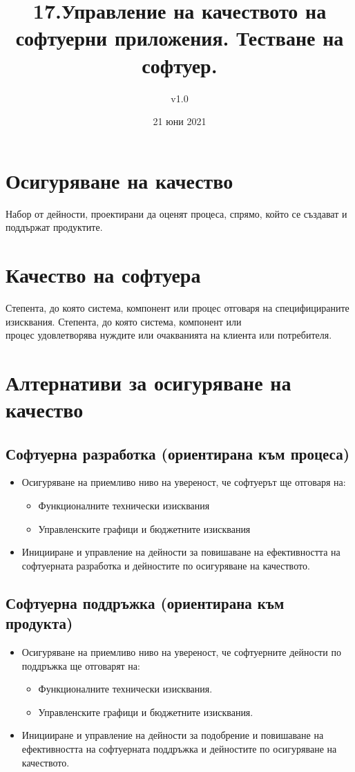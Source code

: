 \documentclass[fleqn,12pt]{article}
\title{17.Управление на качеството на софтуерни приложения. Тестване на софтуер.}
\author{v1.0}
\date{21 юни 2021}
\begin{document}
\maketitle

\tableofcontents

\begin{flushleft}

\section{Осигуряване на качество}
Набор от дейности, проектирани да оценят процеса, спрямо, който се създават и поддържат продуктите.

\section{Качество на софтуера}
Степента, до която система, компонент или процес отговаря на специфицираните изисквания. Степента, до която система, компонент или\\
процес удовлетворява нуждите или очакванията на клиента или потребителя.

\section{Алтернативи за осигуряване на качество}
  \subsection{Софтуерна разработка (ориентирана към процеса)}
  \begin{itemize}
    \item Осигуряване на приемливо ниво на увереност, че софтуерът ще отговаря на:
      \begin{itemize}
        \item Функционалните технически изисквания
        \item Управленските графици и бюджетните изисквания
      \end{itemize}
    \item Иницииране и управление на дейности за повишаване на ефективността на софтуерната разработка и дейностите по осигуряване на качеството.
  \end{itemize}
  \subsection{Софтуерна поддръжка (ориентирана към продукта)}
  \begin{itemize}
    \item Осигуряване на приемливо ниво на увереност, че софтуерните дейности по поддръжка ще отговарят на:
        \begin{itemize}
            \item Функционалните технически изисквания.
            \item Управленските графици и бюджетните изисквания.
        \end{itemize}
    \item Иницииране и управление на дейности за подобрение и повишаване на ефективността на софтуерната поддръжка и дейностите по осигуряване на качеството.
  \end{itemize}

\end{flushleft}
\end{document}
